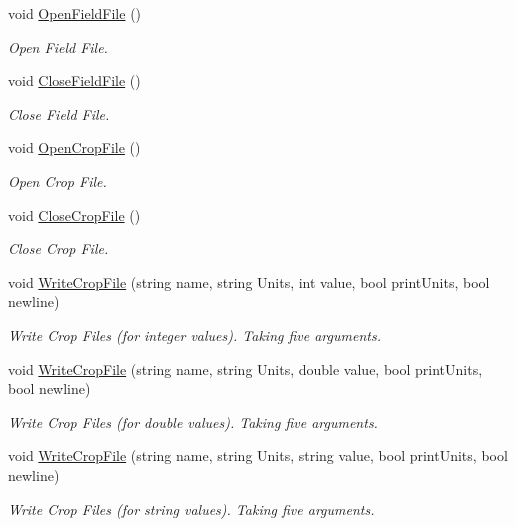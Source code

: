 \begin{DoxyCompactItemize}
void \mbox{\hyperlink{class_global_vars_a5eddc5dbbfc855539c90949c67595a0a}{Open\+Field\+File}} ()
\begin{DoxyCompactList}\small\item\em Open Field File. \end{DoxyCompactList}\item 
void \mbox{\hyperlink{class_global_vars_a60514ab77561eb58b7f8451a91a5d7ad}{Close\+Field\+File}} ()
\begin{DoxyCompactList}\small\item\em Close Field File. \end{DoxyCompactList}\item 
void \mbox{\hyperlink{class_global_vars_a96dcdedd261f3aaf43edfd203a3b940d}{Open\+Crop\+File}} ()
\begin{DoxyCompactList}\small\item\em Open Crop File. \end{DoxyCompactList}\item 
void \mbox{\hyperlink{class_global_vars_a6251df0946f189d52366f2fe300cc2dd}{Close\+Crop\+File}} ()
\begin{DoxyCompactList}\small\item\em Close Crop File. \end{DoxyCompactList}\item 
void \mbox{\hyperlink{class_global_vars_a9b1bf66183c02889a23501ab5d3a0de4}{Write\+Crop\+File}} (string name, string Units, int value, bool print\+Units, bool newline)
\begin{DoxyCompactList}\small\item\em Write Crop Files (for integer values). Taking five arguments. \end{DoxyCompactList}\item 
void \mbox{\hyperlink{class_global_vars_af17b981031311501a80d8940eb29435f}{Write\+Crop\+File}} (string name, string Units, double value, bool print\+Units, bool newline)
\begin{DoxyCompactList}\small\item\em Write Crop Files (for double values). Taking five arguments. \end{DoxyCompactList}\item 
void \mbox{\hyperlink{class_global_vars_af5e4133cf1abfac8641c566872117fd2}{Write\+Crop\+File}} (string name, string Units, string value, bool print\+Units, bool newline)
\begin{DoxyCompactList}\small\item\em Write Crop Files (for string values). Taking five arguments. \end{DoxyCompactList}\item 

\end{DoxyCompactItemize}
